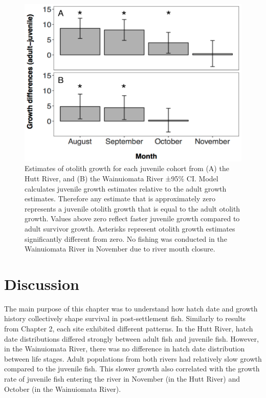 \documentclass[]{book}
\begin{document}
\begin{figure}
\centering
\includegraphics{images/data-chapter-3/growth-distributions.png}
\caption{\label{fig:growth-distributions}Estimates of otolith growth for
each juvenile cohort from (A) the Hutt River, and (B) the Wainuiomata
River ±95\% CI. Model calculates juvenile growth estimates relative to
the adult growth estimates. Therefore any estimate that is approximately
zero represents a juvenile otolith growth that is equal to the adult
otolith growth. Values above zero reflect faster juvenile growth
compared to adult survivor growth. Asterisks represent otolith growth
estimates significantly different from zero. No fishing was conducted in
the Wainuiomata River in November due to river mouth closure.}
\end{figure}

\section{Discussion}\label{discussion-2}

The main purpose of this chapter was to understand how hatch date and
growth history collectively shape survival in post-settlement fish.
Similarly to results from Chapter 2, each site exhibited different
patterns. In the Hutt River, hatch date distributions differed strongly
between adult fish and juvenile fish. However, in the Wainuiomata River,
there was no difference in hatch date distribution between life stages.
Adult populations from both rivers had relatively slow growth compared
to the juvenile fish. This slower growth also correlated with the growth
rate of juvenile fish entering the river in November (in the Hutt River)
and October (in the Wainuiomata River).
\end{document}
